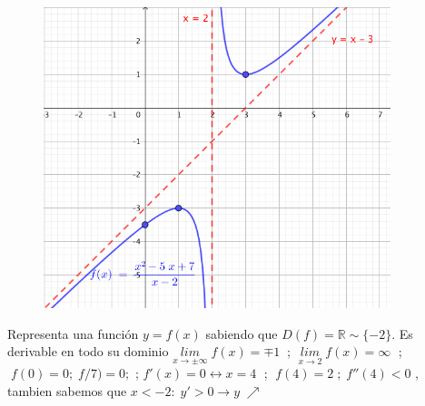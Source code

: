 \begin{proofw}
	\begin{figure}[H]
		\centering
		\includegraphics[width=0.9\textwidth]{imagenes/imagenes05/T05IM33.png}
	\end{figure}
	
\end{proofw}




\begin{ejre} Representa una función $y=f(x)$ sabiendo que $D(f)=\mathbb R \sim \{-2\}$. Es derivable en todo su dominio $\underset {x\to \pm\infty}{lim}\;{f(x)}=\mp 1\; \; $; $\; \underset {x\to 2}{lim}\; {f(x)}=\infty \; $ ; $\; f(0)=0; \; f/7)=0; $ ; $f'(x)=0 \leftrightarrow x=4 \; $ ; $\; f(4)=2\; ; \; f''(4)<0$ , tambien sabemos que $x<-2: \;  y'>0 \to y\; \nearrow$
	
\end{ejre}

